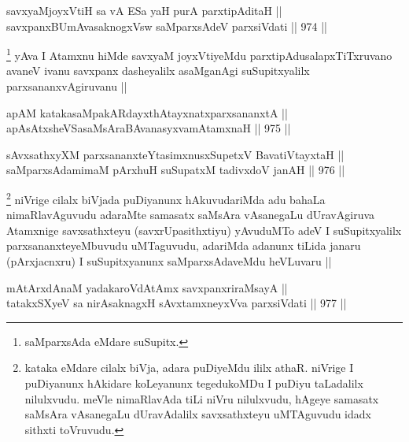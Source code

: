 
\begin{shl}
savxyaMjoyxVtiH sa vA ESa yaH purA parxtipAditaH || \\
savxpanxBUmAvasaknogxV\s sw saMparxsAdeV parxsiVdati ||  974 ||  
\end{shl}

\begin{artha}
\footnote{saMparxsAda eMdare suSupitx.}
yAva I Atamxnu hiMde savxyaM joyxVtiyeMdu parxtipAdusalapxTiTxruvano avaneV ivanu savxpanx dasheyalilx asaMganAgi suSupitxyalilx parxsananxvAgiruvanu ||
\end{artha}


\begin{shl}
apAM katakasaMpakARdayxthA\s tayxnatxparxsananxtA || \\
apAsAtxsheVSasaMsAraBAvanasyxvamAtamxnaH ||  975 ||  
\end{shl}
				
\begin{shl}
sAvxsathxyXM parxsananxteYtasimxnusxSupetxV BavatiVtayxtaH || \\
saMparxsAdamimaM pArxhuH suSupatxM tadivxdoV janAH ||  976 ||  
\end{shl}

\begin{artha}
\footnote{kataka eMdare cilalx biVja, adara puDiyeMdu ililx athaR. niVrige I puDiyanunx hAkidare koLeyanunx tegedukoMDu I puDiyu taLadalilx nilulxvudu. meVle nimaRlavAda tiLi niVru nilulxvudu, hAgeye samasatx saMsAra vAsanegaLu dUravAdalilx savxsathxteyu uMTAguvudu idadx sithxti toVruvudu.}
niVrige cilalx biVjada puDiyanunx hAkuvudariMda adu bahaLa nimaRlavAguvudu adaraMte samasatx saMsAra vAsanegaLu dUravAgiruva Atamxnige savxsathxteyu (savxrUpasithxtiyu) yAvuduMTo adeV I suSupitxyalilx parxsananxteyeMbuvudu uMTaguvudu, adariMda adanunx tiLida janaru (pArxjacnxru) I suSupitxyanunx saMparxsAdaveMdu heVLuvaru ||
\end{artha}


\begin{shl}
mAtArxdAnaM yadakaroVdAtAmx savxpanxriraMsayA || \\
tatakxSXyeV sa nirAsaknagxH sAvxtamxneyxVva parxsiVdati ||  977 ||  
\end{shl}

